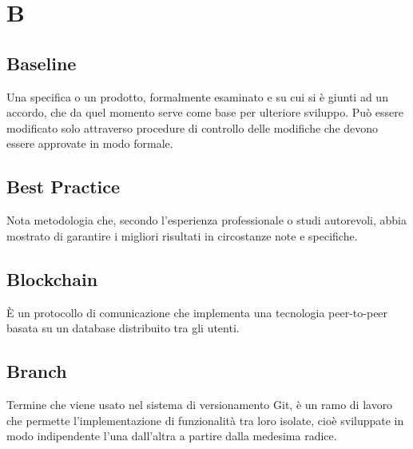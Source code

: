 \section*{B}

\subsection{Baseline}
Una specifica o un prodotto, formalmente esaminato e su cui si è giunti ad un accordo, che da quel momento serve come base per ulteriore sviluppo. Può essere modificato solo attraverso procedure di controllo delle modifiche che devono essere approvate in modo formale.

\subsection{Best Practice}
Nota metodologia che, secondo l'esperienza professionale o studi autorevoli, abbia mostrato di garantire i migliori risultati in circostanze note e specifiche.

\subsection{Blockchain}
È un protocollo di comunicazione che implementa una tecnologia peer-to-peer basata su un database distribuito tra gli utenti.

\subsection{Branch}
Termine che viene usato nel sistema di versionamento Git, è un ramo di lavoro che permette l'implementazione di funzionalità tra loro isolate, cioè sviluppate in modo indipendente l'una dall'altra a partire dalla medesima radice.